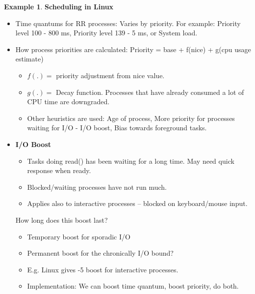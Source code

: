 \documentclass[11pt,a4paper]{article}
\theoremstyle{definition}
\newtheorem{example}{Example}[section]
\newenvironment{myitemize}
{ \begin{itemize}
    \setlength{\itemsep}{5pt}
    \setlength{\parskip}{0pt}
    \setlength{\parsep}{0pt}     }
{ \end{itemize}                  }
\begin{document}
\begin{example}{\textbf{Scheduling in Linux}}
\begin{myitemize}
\begin{tcolorbox}
			\begin{myitemize}
				\item CPU time used so far is recorded. Process is moved to a queue of blocked processes.
				\item When process becomes runnable again, it continues running until its time quantum is expired.
				\item It is then moved to the expired set.
				\item When a process becomes blocked its priority is often upgraded and given MORE CPU time to catch up.
			\end{myitemize}
		\end{tcolorbox}
		\item Time quantums for RR processes: Varies by priority. For example: Priority level 100 - 800 ms, Priority level 139 - 5 ms, or System load.
		\item How process priorities are calculated: Priority = base + f(nice) + g(cpu usage estimate)
		\begin{myitemize}
			\item $f(.) =$ priority adjustment from nice value.
			\item $g(.) =$ Decay function. Processes that have already consumed a lot of CPU time are downgraded.
			\item Other heuristics are used: Age of process, More priority for processes waiting for I/O - I/O boost, Bias towards foreground tasks.
		\end{myitemize}
		\item \textbf{I/O Boost}
		\begin{myitemize}
			\item Tasks doing read() has been waiting for a long time. May need quick response when ready.
			\item Blocked/waiting processes have not run much.
			\item Applies also to interactive processes – blocked on keyboard/mouse input.
		\end{myitemize}
		\begin{tcolorbox}
			\textsf{How long does this boost last?}
			\begin{myitemize}
				\item Temporary boost for sporadic I/O
				\item Permanent boost for the chronically I/O bound?
				\item E.g. Linux gives -5 boost for interactive processes.
				\item Implementation: We can boost time quantum, boost priority, do both.
			\end{myitemize}
		\end{tcolorbox}
	\end{myitemize}
\end{example}
\end{document}

